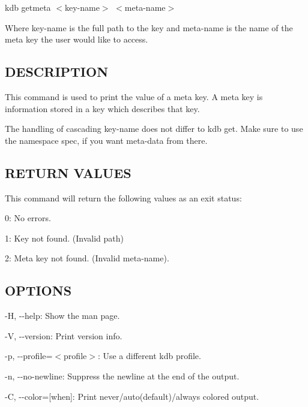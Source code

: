 {\ttfamily kdb getmeta $<$key-\/name$>$ $<$meta-\/name$>$}

Where {\ttfamily key-\/name} is the full path to the key and {\ttfamily meta-\/name} is the name of the meta key the user would like to access.

\subsection*{D\+E\+S\+C\+R\+I\+P\+T\+I\+O\+N}

This command is used to print the value of a meta key. A meta key is information stored in a key which describes that key.

The handling of cascading {\ttfamily key-\/name} does not differ to {\ttfamily kdb get}. Make sure to use the namespace {\ttfamily spec}, if you want meta-\/data from there.

\subsection*{R\+E\+T\+U\+R\+N V\+A\+L\+U\+E\+S}

This command will return the following values as an exit status\+:
\begin{DoxyItemize}
\item 0\+: No errors.
\item 1\+: Key not found. (Invalid {\ttfamily path})
\item 2\+: Meta key not found. (Invalid {\ttfamily meta-\/name}).
\end{DoxyItemize}

\subsection*{O\+P\+T\+I\+O\+N\+S}


\begin{DoxyItemize}
\item {\ttfamily -\/\+H}, {\ttfamily -\/-\/help}\+: Show the man page.
\item {\ttfamily -\/\+V}, {\ttfamily -\/-\/version}\+: Print version info.
\item {\ttfamily -\/p}, {\ttfamily -\/-\/profile}=$<$profile$>$\+: Use a different kdb profile.
\item {\ttfamily -\/n}, {\ttfamily -\/-\/no-\/newline}\+: Suppress the newline at the end of the output.
\item {\ttfamily -\/\+C}, {\ttfamily -\/-\/color}=\mbox{[}when\mbox{]}\+: Print never/auto(default)/always colored output.
\end{DoxyItemize}

